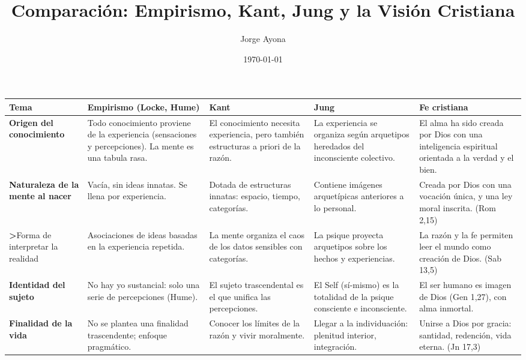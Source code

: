 \documentclass[12pt]{article}
\title{Comparación: Empirismo, Kant, Jung y la Visión Cristiana}
\author{Jorge Ayona}
\date{\today}
\begin{document}
\maketitle

\begin{tabularx}{\textwidth}{>{\raggedright\arraybackslash}p{3.3cm} 
>{\raggedright\arraybackslash}X 
>{\raggedright\arraybackslash}X 
>{\raggedright\arraybackslash}X 
>{\raggedright\arraybackslash}X}
\toprule
\textbf{Tema} & \textbf{Empirismo (Locke, Hume)} & \textbf{Kant} & \textbf{Jung} & \textbf{Fe cristiana} \\
\midrule

\textbf{Origen del conocimiento} & 
Todo conocimiento proviene de la experiencia (sensaciones y percepciones). La mente es una tabula rasa. & 
El conocimiento necesita experiencia, pero también estructuras a priori de la razón. & 
La experiencia se organiza según arquetipos heredados del inconsciente colectivo. & 
El alma ha sido creada por Dios con una inteligencia espiritual orientada a la verdad y el bien. \\

\textbf{Naturaleza de la mente al nacer} & 
Vacía, sin ideas innatas. Se llena por experiencia. & 
Dotada de estructuras innatas: espacio, tiempo, categorías. & 
Contiene imágenes arquetípicas anteriores a lo personal. & 
Creada por Dios con una vocación única, y una ley moral inscrita. (Rom 2,15) \\

\textbf>Forma de interpretar la realidad & 
Asociaciones de ideas basadas en la experiencia repetida. & 
La mente organiza el caos de los datos sensibles con categorías. & 
La psique proyecta arquetipos sobre los hechos y experiencias. & 
La razón y la fe permiten leer el mundo como creación de Dios. (Sab 13,5) \\

\textbf{Identidad del sujeto} & 
No hay yo sustancial: solo una serie de percepciones (Hume). & 
El sujeto trascendental es el que unifica las percepciones. & 
El Self (sí-mismo) es la totalidad de la psique consciente e inconsciente. & 
El ser humano es imagen de Dios (Gen 1,27), con alma inmortal. \\

\textbf{Finalidad de la vida} & 
No se plantea una finalidad trascendente; enfoque pragmático. & 
Conocer los límites de la razón y vivir moralmente. & 
Llegar a la individuación: plenitud interior, integración. & 
Unirse a Dios por gracia: santidad, redención, vida eterna. (Jn 17,3) \\
\bottomrule
\end{tabularx}
\end{document}
